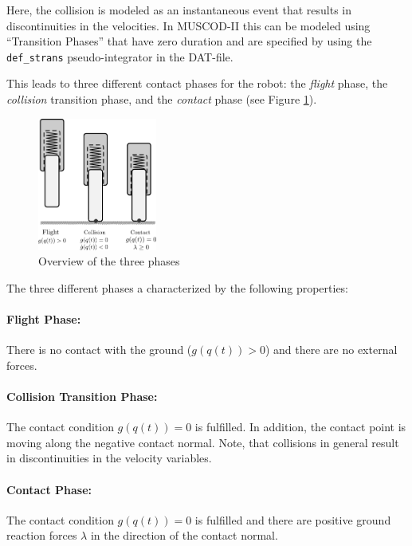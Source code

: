 \documentclass[a4paper,english,12pt]{report}
\newcommand{\muscod}[0]{\textsc{MUSCOD-II}}
\begin{document}
Here, the collision is modeled as an instantaneous event that results in
discontinuities in the velocities. In \muscod{} this can be modeled using
``Transition Phases'' that have zero duration and are specified by using
the \texttt{def\_strans} pseudo-integrator in the DAT-file.

This leads to three different contact phases for the robot: the
\emph{flight} phase, the \emph{collision} transition phase, and the
\emph{contact} phase (see Figure \ref{fig:phase_overview}).

\begin{figure}
	\begin{center}
		\includegraphics[width=0.35\textwidth]{./phase_overview}
	\end{center}
	\caption{Overview of the three phases}
	\label{fig:phase_overview}
\end{figure}

The three different phases a characterized by the following properties:

\paragraph{Flight Phase:} There is no contact with the ground ($g(q(t)) > 0$) and there are no external forces.

\paragraph{Collision Transition Phase:} The contact condition $g(q(t))
= 0$ is fulfilled. In addition, the contact point is moving along the
negative contact normal. Note, that collisions in general result in
discontinuities in the velocity variables.

\paragraph{Contact Phase:}The contact condition $g(q(t)) = 0$ is fulfilled and there are positive ground reaction forces $\lambda$ in the direction of the contact normal.
\end{document}
